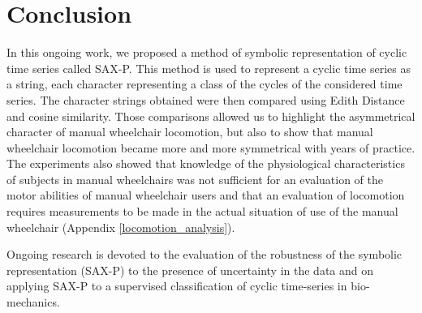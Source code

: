 \section{Conclusion}
In this ongoing work, we proposed a method of symbolic representation of cyclic time series called SAX-P. This method is used to represent a cyclic time series as a string, each character representing a class of the cycles of the considered time series. The character strings obtained were then compared using Edith Distance and cosine similarity. Those comparisons allowed us to highlight the asymmetrical character of manual wheelchair locomotion, but also to show that manual wheelchair locomotion became more and more symmetrical with years of practice. The experiments also showed that knowledge of the physiological characteristics of subjects in manual wheelchairs was not sufficient for an evaluation of the motor abilities of manual wheelchair users and that an evaluation of locomotion requires measurements to be made in the actual situation of use of the manual wheelchair (Appendix \ref{locomotion_analysis}). 

Ongoing research is devoted to the evaluation of the robustness of the symbolic representation (SAX-P) to the presence of uncertainty in the data and on applying SAX-P to a  supervised classification of cyclic time-series in bio-mechanics.
 
